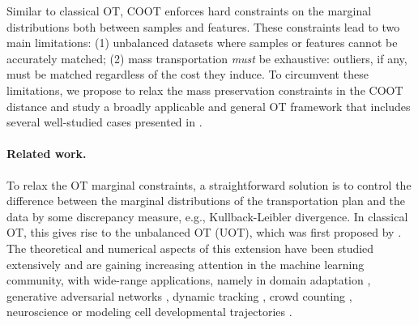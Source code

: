 Similar to classical OT, COOT enforces hard constraints on the marginal distributions
both between samples and features. These constraints lead to two main limitations:
(1) unbalanced datasets where samples or features cannot be accurately matched;
(2) mass transportation \emph{must} be exhaustive:
outliers, if any, must be matched regardless of the cost they induce.
To circumvent these limitations, we propose to relax the mass preservation constraints
in the COOT distance and study a broadly applicable and general OT framework
that includes several well-studied cases presented in .

\paragraph{Related work.}
To relax the OT marginal constraints, a straightforward solution is to control
the difference between the marginal distributions of the transportation plan
and the data by some discrepancy measure, e.g., Kullback-Leibler divergence.
In classical OT, this gives rise to the unbalanced OT (UOT),
which was first proposed by \citet{Benamou03}.
The theoretical and numerical aspects of this extension
have been studied extensively \citep{Liero18,Chizat18b,Chizat18a,Khiem20}
and are gaining increasing attention in the machine
learning community, with wide-range applications, namely in
domain adaptation \citep{Fatras21}, generative adversarial networks
\citep{Balaji20, Yang19}, dynamic tracking \citep{Lee19}, crowd counting \citep{Ma21},
neuroscience \citep{janati2019group, bazeille2019} or
modeling cell developmental trajectories \citep{Schiebinger19}.

